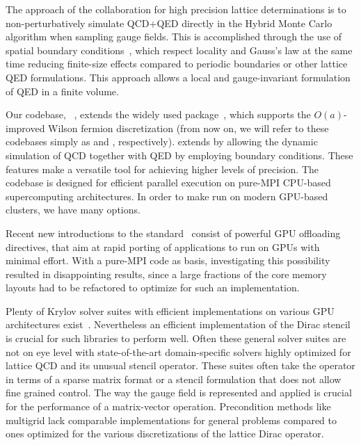 The approach of the \RCstar collaboration for high precision lattice determinations is to non-perturbatively simulate QCD+QED directly in the Hybrid Monte Carlo algorithm when sampling gauge fields. This is accomplished through the use of \Cstar spatial boundary conditions~\cite{cstar:Wiese1992,cstar:Polley1993,cstar:Kronfeld1991,cstar:Kronfeld1993}, which respect locality and Gauss's law at the same time reducing finite-size effects compared to periodic boundaries or other lattice QED formulations. This approach allows a local and gauge-invariant formulation of QED in a finite volume.

Our codebase, \openqxd~\cite{openqxd,gitlab:openqxd}, extends the widely used  package~\cite{online:openqcd}, which supports the $O(a)$-improved Wilson fermion discretization (from now on, we will refer to these codebases simply as \openqxd and \openqcd, respectively).
\Openqxd extends \openqcd by allowing the dynamic simulation of QCD together with QED by employing \Cstar boundary conditions.
These features make \openqxd a versatile tool for achieving higher levels of precision.
The codebase is designed for efficient parallel execution on pure-MPI CPU-based supercomputing architectures.
In order to make \openqxd run on modern GPU-based clusters, we have many options.


Recent new introductions to the \openmp standard~\cite{openmp,openmp:standard:4.0} consist of powerful GPU offloading directives, that aim at rapid porting of \openmp applications to run on GPUs with minimal effort.
With a pure-MPI code as basis, investigating this possibility resulted in disappointing results, since a large fractions of the core memory layouts had to be refactored to optimize for such an implementation.

Plenty of Krylov solver suites with efficient implementations on various GPU architectures exist~\cite{doi:10.1177/1094342016646844,7529929,866,816,833,KNIBBE2011281,ganesan2020sparshamglibraryhybridcpugpu,anzt2017preconditioned}.
Nevertheless an efficient implementation of the Dirac stencil is crucial for such libraries to perform well.
Often these general solver suites are not on eye level with state-of-the-art domain-specific solvers highly optimized for lattice QCD and its unusual stencil operator.
These suites often take the operator in terms of a sparse matrix format or a stencil formulation that does not allow fine grained control.
The way the gauge field is represented and applied is crucial for the performance of a matrix-vector operation.
Precondition methods like multigrid lack comparable implementations for general problems compared to ones optimized for the various discretizations of the lattice Dirac operator.

